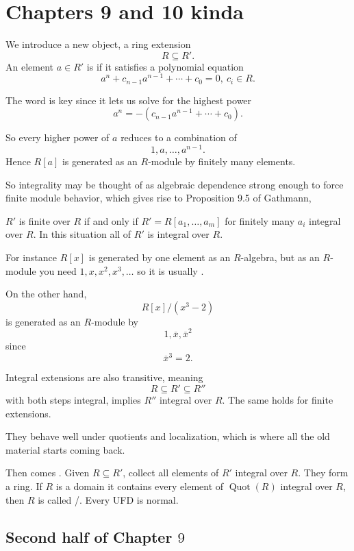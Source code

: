 \documentclass[11pt]{article}
\begin{document}
\section{Chapters 9 and 10 kinda}

We introduce a new object, a ring extension 
\[
    R \subseteq R'. 
\]
An element $a \in R'$ is  
if it satisfies a  polynomial equation 
\[
    a^n + c_{n-1}a^{n-1} + \cdots + c_0 = 0, \ c_i \in R. 
\]

The word  is key since it 
lets us solve for the highest power 
\[
    a^n = -(c_{n-1}a^{n-1} + \cdots + c_0). 
\]

So every higher power of $a$ reduces 
to a combination of 
\[
    1,a,\ldots,a^{n-1}. 
\]
Hence $R[a]$ is generated as an $R$-module 
by finitely many elements. 

So integrality may be thought of as algebraic 
dependence strong enough to force finite module behavior, 
which gives rise to Proposition 9.5 of Gathmann, 
\begin{prop}
    $R'$ is finite over $R$ 
    if and only if $R' = R[a_1,\ldots,a_m]$ 
    for finitely many $a_i$ integral over $R$. 
    In this situation all of $R'$ is integral over 
    $R$. 
\end{prop}

For instance $R[x]$ is generated by one 
element as an $R$-algebra, but as an $R$-module 
you need $1,x,x^2,x^3,\ldots$ so it is usually 
. 

On the other hand, 
\[
    R[x]/(x^3 - 2) 
\]
is generated as an $R$-module by 
\[
    1, \overline x, \overline x^2
\]
since 
\[
    \overline x^3 = 2. 
\]

Integral extensions are also transitive, meaning 
\[
    R \subseteq R' \subseteq R''
\]
with both steps integral, implies $R''$ integral over 
$R$. The same holds for finite extensions.

They behave well under quotients and 
localization, which is where all the old material 
starts coming back. 

Then comes . Given 
$R \subseteq R'$, collect all elements of $R'$ integral 
over $R$. They form a ring. If $R$ is a domain it 
contains every element of $\operatorname{Quot}(R)$ 
integral over $R$, then $R$ is called 
/. Every 
UFD is normal. 

\subsection{Second half of Chapter $9$}
\end{document}
